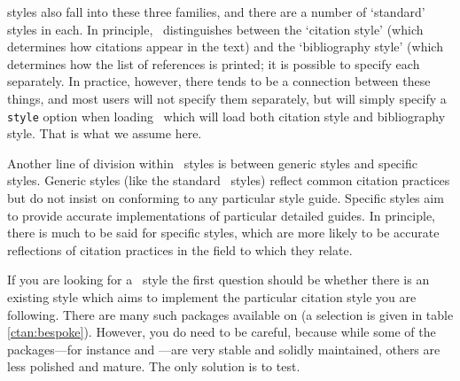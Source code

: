  styles also fall into these three families, and
there are a number of `standard' styles in each. In principle,
\biblatex\ distinguishes between the `citation
style' (which
determines how citations appear in the text) and the `bibliography
style' (which
determines how the list of references is printed; it is possible to
specify each separately. In practice, however, there tends to be a
connection between these things, and most users will not specify them
separately, but will simply specify a \verb|style| option when loading
\biblatex\, which will load both citation style and bibliography
style. That is what we assume here.

Another line of division within \biblatex\ styles is between generic
styles and specific styles. Generic styles (like the standard
\biblatex\ styles) reflect common citation practices but do not insist
on conforming to any particular style guide. Specific styles aim to
provide accurate implementations of particular detailed guides. In
principle, there is much to be said for specific styles, which are
more likely to be accurate reflections of citation practices in the
field to which they relate.

If you are looking for a \biblatex\ style the first question should be
whether there is an existing style which aims to implement the
particular citation style you are following. There are many such
packages available on  (a selection is given in table
\ref{ctan:bespoke}). However, you do need to be careful, because while
some of the packages---for instance  and
---are very stable and solidly maintained,
others are less polished and mature. The only solution is to test.


